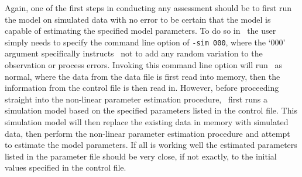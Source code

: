 \begin{multicols}{2}
Again, one of the first steps in conducting any assessment should be to first run the model on simulated data with no error to be certain that the model is capable of estimating the specified model parameters.  To do so in \iscam\, the user simply needs to specify the command line option of \texttt{-sim 000}, where the `000' argument specifically instructs \iscam\ not to add any random variation to the observation or process errors.  Invoking this command line option will run \iscam\ as normal, where the data from the data file is first read into memory, then the information from the control file is then read in.  However, before proceeding straight into the non-linear parameter estimation procedure, \iscam\ first runs a simulation model based on the specified parameters listed in the control file.  This simulation model will then replace the existing data in memory with simulated data, then perform the non-linear parameter estimation procedure and attempt to estimate the model parameters.  If all is working well the estimated parameters listed in the parameter file should be very close, if not exactly, to the initial values specified in the control file.



\end{multicols}

